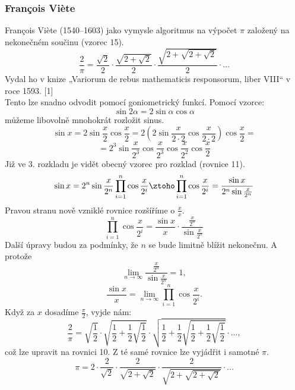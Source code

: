 \documentclass[rocnikovka]{gzwroc} %
\begin{document}
\subsubsection{François Viète}
François Viète (1540–1603) jako  vymysle algoritmus na výpočet $\pi$ založený na nekonečném součinu (vzorec 15).
\begin{equation}
\frac{2}{\pi}=\frac{\sqrt{2}}{2}\cdot\frac{\sqrt{2+\sqrt{2}}}{2}\cdot\frac{\sqrt{2+\sqrt{2+\sqrt{2}}}}{2}\cdot ...
\end{equation}
Vydal ho v knize „Variorum de rebus mathematicis responsorum, liber VIII“ v roce 1593. [1]\\
Tento lze snadno odvodit pomocí goniometrický funkcí. Pomocí vzorce:
$$
\sin 2\alpha = 2\sin \alpha \cos \alpha
$$
můžeme libovolně mnohokrát rozložit sinus.
$$
\sin x = 2\sin \frac{x}{2} \cos \frac{x}{2} = 2\left( 2\sin \frac{x}{2\cdot 2} \cos \frac{x}{2\cdot 2}\right) \cos \frac{x}{2} =
$$
\begin{equation}
= 2^3 \sin \frac{x}{2^3} \cos \frac{x}{2^3} \cos \frac{x}{2^2} \cos \frac{x}{2}
\end{equation}
Již ve 3. rozkladu je vidět obecný vzorec pro rozklad (rovnice 11).
\begin{equation}
\sin x =2^n \sin \frac{x}{2^n}\prod_{i=1}^{n} \cos \frac{x}{2^i} \ztoho \prod_{i=1}^{n} \cos \frac{x}{2^i} = \frac{\sin x}{2^n \sin \frac{x}{2^n}}
\end{equation}
Pravou stranu nově vzniklé rovnice rozšíříme o $\frac{x}{x}$.
\begin{equation}
\prod_{i=1}^{n} \cos \frac{x}{2^i} = \frac{\sin x}{x} \cdot  \frac{\frac{x}{2^n}}{\sin \frac{x}{2^n}}
\end{equation}
Další úpravy budou za podmínky, že $n$ se bude limitně blížit nekonečnu. A protože
$$
\lim_{n\to\infty} \frac{\frac{x}{2^n}}{\sin \frac{x}{2^n}} = 1,
$$
\begin{equation}
\frac{\sin x}{x} = \lim_{n\to\infty} \prod_{i=1}^{n} \cos \frac{x}{2^i}.
\end{equation}
Když za $x$ dosadíme $\frac{\pi}{2}$, vyjde nám:
\begin{equation}
\frac{2}{\pi}=\sqrt{\frac{1}{2}}\cdot\sqrt{\frac{1}{2}+\frac{1}{2}\sqrt{\frac{1}{2}}}\cdot\sqrt{\frac{1}{2}+\frac{1}{2}\sqrt{\frac{1}{2}+\frac{1}{2}\sqrt{\frac{1}{2}}}}\cdot ...,
\end{equation}
což lze upravit na rovnici 10. Z té samé rovnice lze vyjádřit i samotné $\pi$.
$$
\pi=2\cdot\frac{2}{\sqrt{2}}\cdot\frac{2}{\sqrt{2+\sqrt{2}}}\cdot\frac{2}{\sqrt{2+\sqrt{2+\sqrt{2}}}}\cdot ...
$$
\end{document}
